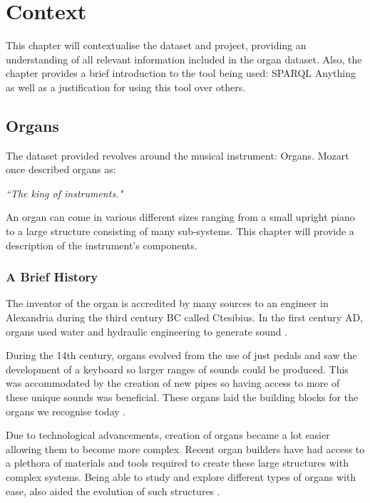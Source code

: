 \chapter{Context}
This chapter will contextualise the dataset and project, providing an understanding of all relevant information included in the organ dataset. Also, the chapter provides a brief introduction to the tool being used: SPARQL Anything as well as a justification for using this tool over others. 

\section{Organs}
\hspace{0.5cm} The dataset provided revolves around the musical instrument: Organs. Mozart once described organs as:

\vspace{-0.15cm}
\begin{displayquote}
    \textit{``The king of instruments."}
\end{displayquote}
\vspace{-0.15cm}

An organ can come in various different sizes ranging from a small upright piano to a large structure consisting of many sub-systems. This chapter will provide a description of the instrument's components.

\subsection{A Brief History}
\hspace{0.5cm} 
The inventor of the organ is accredited by many sources to an engineer in Alexandria during the third century BC called Ctesibius. In the first century AD, organs used water and hydraulic engineering to generate sound \cite{organhistory}.

During the 14th century, organs evolved from the use of just pedals and saw the development of a keyboard so larger ranges of sounds could be produced. This was accommodated by the creation of new pipes so having access to more of these unique sounds was beneficial. These organs laid the building blocks for the organs we recognise today \cite{organmedivalhistory}.

Due to technological advancements, creation of organs became a lot easier allowing them to become more complex. Recent organ builders have had access to a plethora of materials and tools required to create these large structures with complex systems. Being able to study and explore different types of organs with ease, also aided the evolution of such structures \cite{organhistory1}.

